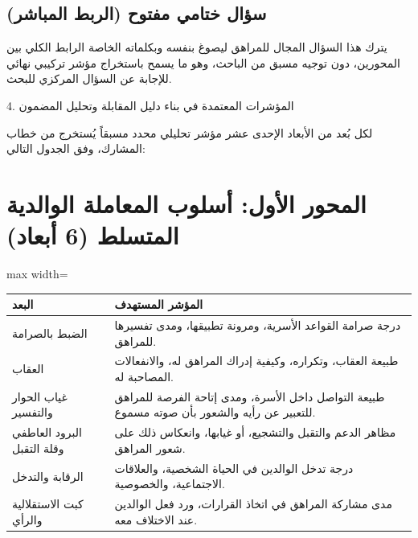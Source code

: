 \documentclass[12pt,oneside]{report}
\begin{document}
\subsection{سؤال ختامي مفتوح (الربط المباشر)}
يترك هذا السؤال المجال للمراهق ليصوغ بنفسه وبكلماته الخاصة الرابط الكلي بين المحورين، دون توجيه مسبق من الباحث، وهو ما يسمح باستخراج مؤشر تركيبي نهائي للإجابة عن السؤال المركزي للبحث.

4. المؤشرات المعتمدة في بناء دليل المقابلة وتحليل المضمون

لكل بُعد من الأبعاد الإحدى عشر مؤشر تحليلي محدد مسبقاً يُستخرج من خطاب المشارك، وفق الجدول التالي:

\section{المحور الأول: أسلوب المعاملة الوالدية المتسلط (6 أبعاد)}
\begin{table}[H]
\centering
\small
\renewcommand{\arraystretch}{1.3}
\setlength{\tabcolsep}{4pt}
\begin{adjustbox}{max width=\textwidth}
\begin{tabular}{p{3.8cm} p{9.6cm}}
\toprule
\textbf{البعد} & \textbf{المؤشر المستهدف} \\
\midrule
الضبط بالصرامة & درجة صرامة القواعد الأسرية، ومرونة تطبيقها، ومدى تفسيرها للمراهق. \\
العقاب & طبيعة العقاب، وتكراره، وكيفية إدراك المراهق له، والانفعالات المصاحبة له. \\
غياب الحوار والتفسير & طبيعة التواصل داخل الأسرة، ومدى إتاحة الفرصة للمراهق للتعبير عن رأيه والشعور بأن صوته مسموع. \\
البرود العاطفي وقلة التقبل & مظاهر الدعم والتقبل والتشجيع، أو غيابها، وانعكاس ذلك على شعور المراهق. \\
الرقابة والتدخل & درجة تدخل الوالدين في الحياة الشخصية، والعلاقات الاجتماعية، والخصوصية. \\
كبت الاستقلالية والرأي & مدى مشاركة المراهق في اتخاذ القرارات، ورد فعل الوالدين عند الاختلاف معه. \\
\bottomrule
\end{tabular}
\end{adjustbox}
\end{table}
\end{document}
